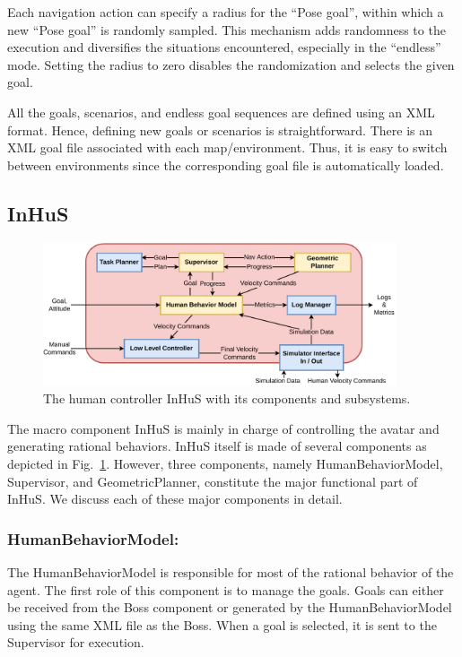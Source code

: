 Each navigation action can specify a radius for the ``Pose goal'', within which a new ``Pose goal'' is randomly sampled. This mechanism adds randomness to the execution and diversifies the situations encountered, especially in the ``endless'' mode. Setting the radius to zero disables the randomization and selects the given goal.

All the goals, scenarios, and endless goal sequences are defined using an XML format. Hence, defining new goals or scenarios is straightforward. There is an XML goal file associated with each map/environment. Thus, it is easy to switch between environments since the corresponding goal file is automatically loaded.


\subsection{InHuS}

\begin{figure}[b]
    \centering
    \includegraphics[height=120pt]{images/Chapter6/inhus_2.pdf}
    \caption{
    The human controller InHuS with its components and subsystems. 
    }
    \label{fig:inhus_only}
    \vspace{-1cm}
\end{figure}

The macro component InHuS is mainly in charge of controlling the avatar and generating rational behaviors. InHuS itself is made of several components as depicted in Fig.~\ref{fig:inhus_only}. However, three components, namely HumanBehaviorModel, Supervisor, and GeometricPlanner, constitute the major functional part of InHuS. We discuss each of these major components in detail.


\subsubsection{HumanBehaviorModel:}

The HumanBehaviorModel is responsible for most of the rational behavior of the agent. The first role of this component is to manage the goals. Goals can either be received from the Boss component or generated by the HumanBehaviorModel using the same XML file as the Boss. When a goal is selected, it is sent to the Supervisor for execution. 

